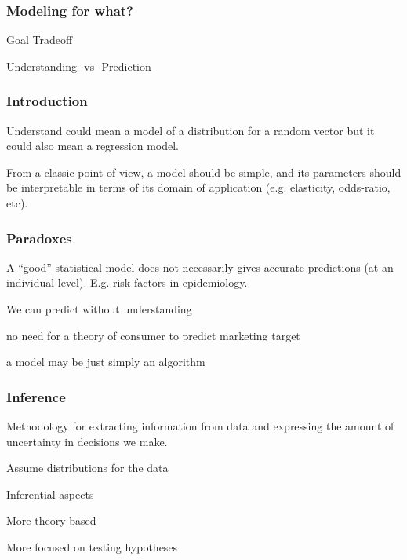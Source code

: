 \documentclass[12pt]{beamer}\usepackage[]{graphicx}\usepackage[]{color}
\begin{document}
\begin{frame}
\frametitle{Modeling for what?}

\centerline{\mdlit \Large Goal Tradeoff}

\bigskip
\centerline{\Large Understanding \quad -vs- \quad Prediction}

\end{frame}


\begin{frame}
\frametitle{Introduction}

Understand could mean a model of a distribution for a random 
vector but it could also mean a regression model.

\bigskip
From a classic point of view, a model should be simple, and its 
parameters should be interpretable in terms of its domain of 
application (e.g. elasticity, odds-ratio, etc).
\eb

\end{frame}


\begin{frame}
\frametitle{Paradoxes}

A ``good'' statistical model does not necessarily gives accurate 
predictions (at an individual level). E.g. risk factors in epidemiology.
\eb

\pause

We can predict without understanding
\bi
  \item no need for a theory of consumer to predict marketing target
  \item a model may be just simply an algorithm
\ei
\eb

\end{frame}


\begin{frame}
\frametitle{Inference}

Methodology for extracting information from data and expressing 
the amount of uncertainty in decisions we make.
\eb

\bi
  \item Assume distributions for the data
  \item Inferential aspects
  \item More theory-based
  \item More focused on testing hypotheses
\ei

\end{frame}
\end{document}
